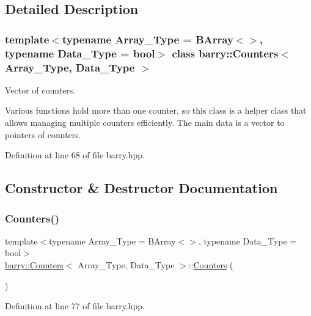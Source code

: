 \subsection{Detailed Description}
\subsubsection*{template$<$typename Array\+\_\+\+Type = B\+Array$<$$>$, typename Data\+\_\+\+Type = bool$>$\newline
class barry\+::\+Counters$<$ Array\+\_\+\+Type, Data\+\_\+\+Type $>$}

Vector of counters. 

Various functions hold more than one counter, so this class is a helper class that allows managing multiple counters efficiently. The main data is a vector to pointers of counters. 

Definition at line 68 of file barry.\+hpp.



\subsection{Constructor \& Destructor Documentation}
\mbox{\label{classbarry_1_1_counters_adebe3273f50b48637efe1b3e73e0dcc6}} 
\subsubsection{\texorpdfstring{Counters()}{Counters()}\hspace{0.1cm}{\footnotesize\ttfamily [1/2]}}
{\footnotesize\ttfamily template$<$typename Array\+\_\+\+Type = B\+Array$<$$>$, typename Data\+\_\+\+Type = bool$>$ \\
\hyperlink{classbarry_1_1_counters}{barry\+::\+Counters}$<$ Array\+\_\+\+Type, Data\+\_\+\+Type $>$\+::\hyperlink{classbarry_1_1_counters}{Counters} (\begin{DoxyParamCaption}{ }\end{DoxyParamCaption})\hspace{0.3cm}{\ttfamily [inline]}}



Definition at line 77 of file barry.\+hpp.

\mbox{\label{classbarry_1_1_counters_acc54ef822eea4170573142ecb189318d}} 
